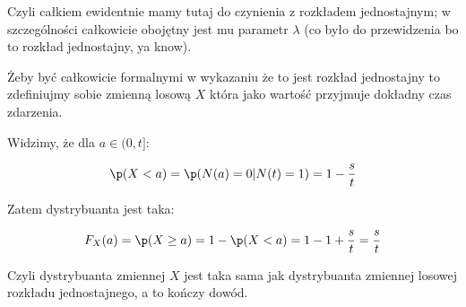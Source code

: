 Czyli całkiem ewidentnie mamy tutaj do czynienia z rozkładem jednostajnym; w szczególności całkowicie obojętny jest mu parametr \(\lambda\) (co było do przewidzenia bo to rozkład jednostajny, ya know).

Żeby być całkowicie formalnymi w wykazaniu że to jest rozkład jednostajny to zdefiniujmy sobie zmienną losową \(X\) która jako wartość przyjmuje dokładny czas zdarzenia.

Widzimy, że dla \( a \in (0, t]\):

\[
	\p(X < a) = \p(N(a)=0 | N(t)=1) = 1 - \frac{s}{t}
\]

Zatem dystrybuanta jest taka:

\[
	F_X(a) = \p(X \geq a) = 1 - \p(X < a) = 1 - 1 + \frac{s}{t} = \frac{s}{t}
\]

Czyli dystrybuanta zmiennej \(X\) jest taka sama jak dystrybuanta zmiennej losowej rozkładu jednostajnego, a to kończy dowód.